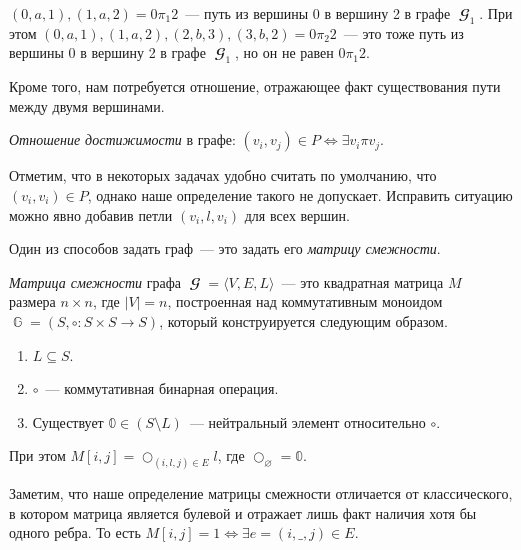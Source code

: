 \begin{example}
    $(0,a,1), (1,a,2) = 0 \pi_1 2$~--- путь из вершины 0 в вершину 2 в графе $\mbfscrG_1$.
    При этом $(0, a, 1), (1, a, 2), (2, b, 3), (3, b, 2) = 0 \pi_2 2$~--- это тоже путь из вершины 0 в вершину 2 в графе $\mbfscrG_1$, но он не равен $0 \pi_1 2$.
\end{example}

Кроме того, нам потребуется отношение, отражающее факт существования пути между двумя вершинами.

\begin{definition}
    \label{def:reach}
    \emph{Отношение достижимости} в графе: $(v_i,v_j) \in P \iff \exists v_i \pi v_j$.
\end{definition}

Отметим, что в некоторых задачах удобно считать по умолчанию, что $(v_i,v_i) \in P$, однако наше определение такого не допускает.
Исправить ситуацию можно явно добавив петли $(v_i,l,v_i)$ для всех вершин.

Один из способов задать граф~--- это задать его \emph{матрицу смежности}.

\begin{definition}
    \emph{Матрица смежности} графа $\mbfscrG = \langle V, E, L \rangle$~--- это квадратная матрица $M$ размера $n \times n$, где $|V| = n$, построенная над коммутативным моноидом $\BbbG = (S, \circ: S \times S \to S)$, который конструируется следующим образом.
    \begin{enumerate}
        \item $L \subseteq S$.
        \item $\circ$~--- коммутативная бинарная операция.
        \item Существует $\Bbbzero \in (S \setminus L)$~--- нейтральный элемент относительно $\circ$.
    \end{enumerate}
    При этом $M[i,j] = \bigcirc_{(i, l, j) \in E}l$, где $\bigcirc_\varnothing = \Bbbzero$.
\end{definition}

Заметим, что наше определение матрицы смежности отличается от классического, в котором матрица является булевой и отражает лишь факт наличия хотя бы одного ребра.
То есть $M[i,j] = 1 \iff \exists e = (i,\_,j) \in E$.

